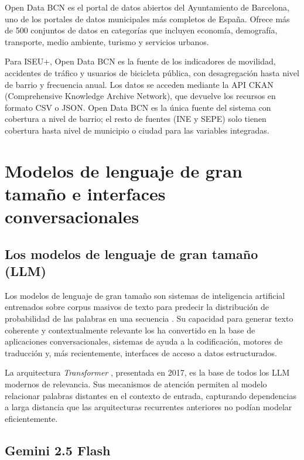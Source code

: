 Open Data BCN \parencite{OpenDataBCN2023} es el portal de datos abiertos del Ayuntamiento de Barcelona, uno de los portales de datos municipales más completos de España. Ofrece más de 500 conjuntos de datos en categorías que incluyen economía, demografía, transporte, medio ambiente, turismo y servicios urbanos.

Para ISEU+, Open Data BCN es la fuente de los indicadores de movilidad, accidentes de tráfico y usuarios de bicicleta pública, con desagregación hasta nivel de barrio y frecuencia anual. Los datos se acceden mediante la API CKAN (Comprehensive Knowledge Archive Network), que devuelve los recursos en formato CSV o JSON. Open Data BCN es la única fuente del sistema con cobertura a nivel de barrio; el resto de fuentes (INE y SEPE) solo tienen cobertura hasta nivel de municipio o ciudad para las variables integradas.

\section{Modelos de lenguaje de gran tamaño e interfaces conversacionales}

\subsection{Los modelos de lenguaje de gran tamaño (LLM)}

Los modelos de lenguaje de gran tamaño son sistemas de inteligencia artificial entrenados sobre corpus masivos de texto para predecir la distribución de probabilidad de las palabras en una secuencia \parencite{Brown2020GPT3}. Su capacidad para generar texto coherente y contextualmente relevante los ha convertido en la base de aplicaciones conversacionales, sistemas de ayuda a la codificación, motores de traducción y, más recientemente, interfaces de acceso a datos estructurados.

La arquitectura \textit{Transformer} \parencite{Vaswani2017Attention}, presentada en 2017, es la base de todos los LLM modernos de relevancia. Sus mecanismos de atención permiten al modelo relacionar palabras distantes en el contexto de entrada, capturando dependencias a larga distancia que las arquitecturas recurrentes anteriores no podían modelar eficientemente.

\subsection{Gemini 2.5 Flash}

